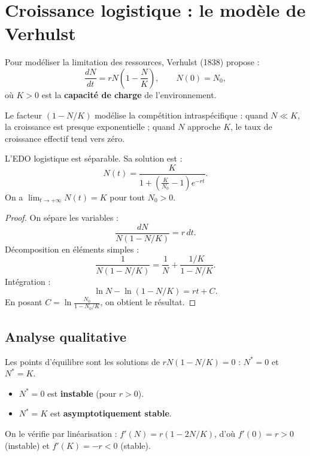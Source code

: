 \section{Croissance logistique : le mod\`ele de Verhulst}
\label{sec:verhulst}

\begin{definition}
Pour mod\'eliser la limitation des ressources, Verhulst (1838)
propose :
\[
  \frac{dN}{dt} = rN\left(1 - \frac{N}{K}\right),
  \qquad N(0) = N_0,
\]
o\`u $K > 0$ est la \textbf{capacit\'e de charge} de l'environnement.
\end{definition}

\begin{intuition}[title=\textbf{Interpr\'etation du terme logistique}]
Le facteur $(1 - N/K)$ mod\'elise la comp\'etition intraspécifique :
quand $N \ll K$, la croissance est presque exponentielle ; quand
$N$ approche $K$, le taux de croissance effectif tend vers z\'ero.
\end{intuition}

\begin{theoreme}
L'EDO logistique est s\'eparable.  Sa solution est :
\[
  N(t) = \frac{K}{1 + \left(\frac{K}{N_0}-1\right)e^{-rt}}.
\]
On a $\lim_{t\to+\infty} N(t) = K$ pour tout $N_0 > 0$.
\end{theoreme}

\begin{proof}
On s\'epare les variables :
\[
  \frac{dN}{N(1-N/K)} = r\,dt.
\]
D\'ecomposition en \'el\'ements simples :
\[
  \frac{1}{N(1-N/K)} = \frac{1}{N} + \frac{1/K}{1-N/K}.
\]
Int\'egration :
\[
  \ln N - \ln(1-N/K) = rt + C.
\]
En posant $C = \ln\frac{N_0}{1-N_0/K}$, on obtient le r\'esultat.
\end{proof}

\subsection{Analyse qualitative}

Les points d'\'equilibre sont les solutions de $rN(1-N/K)=0$ :
$N^*=0$ et $N^*=K$.

\begin{proposition}
\begin{itemize}
  \item $N^*=0$ est \textbf{instable} (pour $r>0$).
  \item $N^*=K$ est \textbf{asymptotiquement stable}.
\end{itemize}
On le v\'erifie par lin\'earisation : $f'(N)=r(1-2N/K)$, d'o\`u
$f'(0)=r>0$ (instable) et $f'(K)=-r<0$ (stable).
\end{proposition}

